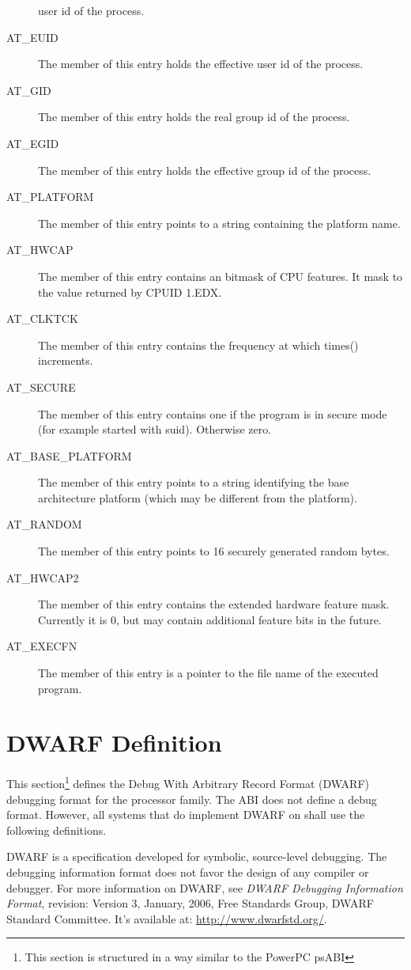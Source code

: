 \begin{description}
  user id of the process.
\item[AT_EUID] The  member of this entry holds the
  effective user id of the process.
\item[AT_GID] The  member of this entry holds the
  real group id of the process.
\item[AT_EGID] The  member of this entry holds the
  effective group id of the process.
\item[AT_PLATFORM] The  member of this entry points to
  a string containing the platform name.
\item[AT_HWCAP] The  member of this entry contains an bitmask
  of CPU features. It mask to the value returned by CPUID 1.EDX.
\item[AT_CLKTCK] The  member of this entry contains the
  frequency at which times() increments.
\item[AT_SECURE] The  member of this entry contains one
  if the program is in secure mode (for example started with suid).
  Otherwise zero.
\item[AT_BASE_PLATFORM] The  member of this entry points to
  a string identifying the base architecture platform (which may be different
  from the platform).
\item[AT_RANDOM] The  member of this entry points to 16 securely
  generated random bytes.
\item[AT_HWCAP2] The  member of this entry contains the extended
  hardware feature mask. Currently it is 0, but may contain additional feature
  bits in the future.
\item[AT_EXECFN] The  member of this entry is a pointer to the
  file name of the executed program.
\end{description}


\section{DWARF Definition}

This section\footnote{This section is structured in a way similar to
  the PowerPC psABI}
defines the Debug With Arbitrary Record Format (DWARF) debugging
format for the \xARCH processor family. The \xARCH ABI does not define
a debug format.  However, all systems that do implement DWARF on \xARCH shall
use the following definitions.

DWARF is a specification developed for symbolic, source-level debugging.
The debugging information format does not favor the design of any
compiler or debugger.  For more information on DWARF,
see \emph{DWARF Debugging Information Format},
revision: Version 3, January, 2006, Free Standards Group,
DWARF Standard Committee.  It's available at:
\url{http://www.dwarfstd.org/}.

